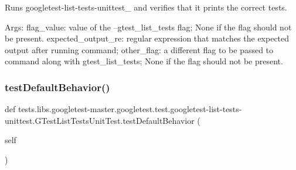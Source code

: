\begin{DoxyVerb}Runs googletest-list-tests-unittest_ and verifies that it prints
the correct tests.

Args:
  flag_value:         value of the --gtest_list_tests flag;
                  None if the flag should not be present.
  expected_output_re: regular expression that matches the expected
                  output after running command;
  other_flag:         a different flag to be passed to command
                  along with gtest_list_tests;
                  None if the flag should not be present.
\end{DoxyVerb}
 \mbox{\label{classtests_1_1libs_1_1googletest-master_1_1googletest_1_1test_1_1googletest-list-tests-unittest_1_1GTestListTestsUnitTest_a78413b87b88cb614df1968f05b66aa2a}} 
\subsubsection{\texorpdfstring{test\+Default\+Behavior()}{testDefaultBehavior()}}
{\footnotesize\ttfamily def tests.\+libs.\+googletest-\/master.\+googletest.\+test.\+googletest-\/list-\/tests-\/unittest.\+G\+Test\+List\+Tests\+Unit\+Test.\+test\+Default\+Behavior (\begin{DoxyParamCaption}\item[{}]{self }\end{DoxyParamCaption})}


